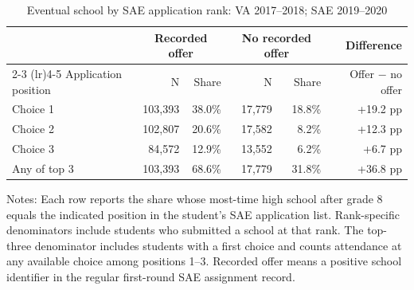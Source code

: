 \begin{table}[!htbp]
\centering
\caption{Eventual school by SAE application rank: VA 2017--2018; SAE 2019--2020}
\label{tab:application-rank-takeup-no-overlap}
\begin{tabular}{lrrrrr}
\toprule
 & \multicolumn{2}{c}{Recorded offer} & \multicolumn{2}{c}{No recorded offer} & Difference \\
\cmidrule(lr){2-3} \cmidrule(lr){4-5}
Application position & N & Share & N & Share & Offer $-$ no offer \\
\midrule
Choice 1 & 103,393 & 38.0\% & 17,779 & 18.8\% & +19.2 pp \\
Choice 2 & 102,807 & 20.6\% & 17,582 & 8.2\% & +12.3 pp \\
Choice 3 & 84,572 & 12.9\% & 13,552 & 6.2\% & +6.7 pp \\
Any of top 3 & 103,393 & 68.6\% & 17,779 & 31.8\% & +36.8 pp \\
\bottomrule
\end{tabular}
\par\medskip
\footnotesize
\begin{minipage}{0.95\textwidth}
Notes: Each row reports the share whose most-time high school after grade 8 equals the indicated position in the student's SAE application list. Rank-specific denominators include students who submitted a school at that rank. The top-three denominator includes students with a first choice and counts attendance at any available choice among positions 1--3. Recorded offer means a positive school identifier in the regular first-round SAE assignment record.
\end{minipage}
\end{table}
